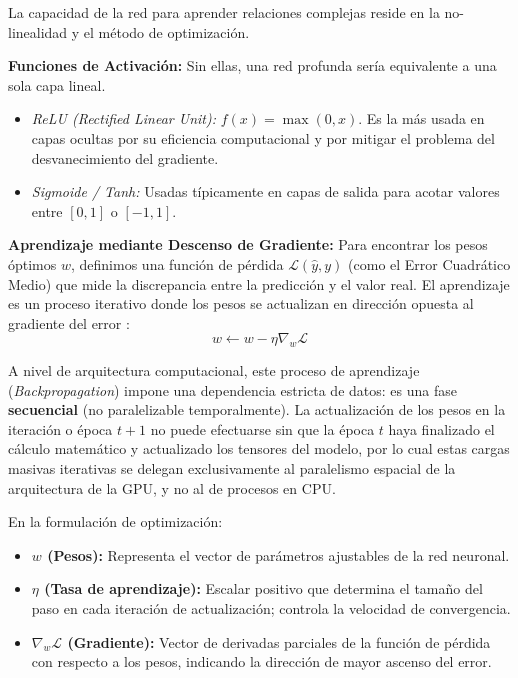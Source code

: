 \documentclass{article}
\begin{document}
La capacidad de la red para aprender relaciones complejas reside en la no-linealidad y el método de optimización.

\textbf{Funciones de Activación:} Sin ellas, una red profunda sería equivalente a una sola capa lineal.
    \begin{itemize}
        \item \textit{ReLU (Rectified Linear Unit):} $f(x) = \max(0, x)$. Es la más usada en capas ocultas por su eficiencia computacional y por mitigar el problema del desvanecimiento del gradiente.
        \item \textit{Sigmoide / Tanh:} Usadas típicamente en capas de salida para acotar valores entre $[0,1]$ o $[-1,1]$.
    \end{itemize}
    
\textbf{Aprendizaje mediante Descenso de Gradiente:}
    Para encontrar los pesos óptimos $w$, definimos una función de pérdida $\mathcal{L}(\hat{y}, y)$ (como el Error Cuadrático Medio) que mide la discrepancia entre la predicción y el valor real. El aprendizaje es un proceso iterativo donde los pesos se actualizan en dirección opuesta al gradiente del error \cite{14}: 
    \begin{equation}
        w \leftarrow w - \eta \nabla_w \mathcal{L}
    \end{equation}
    
    A nivel de arquitectura computacional, este proceso de aprendizaje (\textit{Backpropagation}) impone una dependencia estricta de datos: es una fase \textbf{secuencial} (no paralelizable temporalmente). La actualización de los pesos en la iteración o época $t+1$ no puede efectuarse sin que la época $t$ haya finalizado el cálculo matemático y actualizado los tensores del modelo, por lo cual estas cargas masivas iterativas se delegan exclusivamente al paralelismo espacial de la arquitectura de la GPU, y no al de procesos en CPU.
    
    En la formulación de optimización:
    \begin{itemize}
    \item \textbf{$w$ (Pesos):} Representa el vector de parámetros ajustables de la red neuronal.
    \item \textbf{$\eta$ (Tasa de aprendizaje):} Escalar positivo que determina el tamaño del paso en cada iteración de actualización; controla la velocidad de convergencia.
    \item \textbf{$\nabla_w \mathcal{L}$ (Gradiente):} Vector de derivadas parciales de la función de pérdida con respecto a los pesos, indicando la dirección de mayor ascenso del error.
    \end{itemize}
\end{document}
